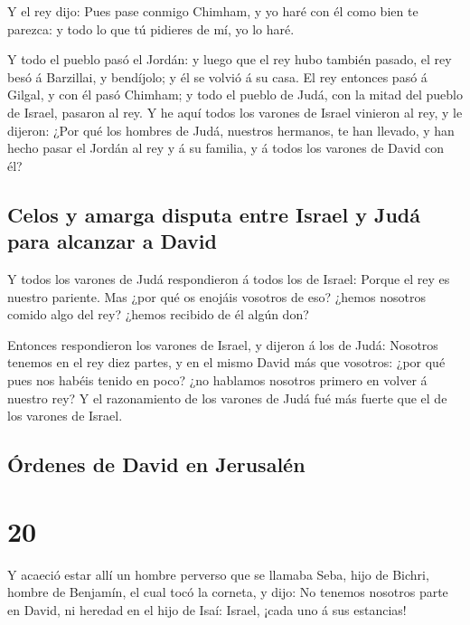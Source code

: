  Y el rey dijo: Pues pase conmigo Chimham, y yo haré con él
como bien te parezca: y todo lo que tú pidieres de mí, yo lo haré.

 Y todo el pueblo pasó el Jordán: y luego que el rey hubo
también pasado, el rey besó á Barzillai, y bendíjolo; y él se volvió á
su casa.  El rey entonces pasó á Gilgal, y con él pasó
Chimham; y todo el pueblo de Judá, con la mitad del pueblo de Israel,
pasaron al rey.  Y he aquí todos los varones de Israel
vinieron al rey, y le dijeron: ¿Por qué los hombres de Judá, nuestros
hermanos, te han llevado, y han hecho pasar el Jordán al rey y á su
familia, y á todos los varones de David con él?

\hypertarget{celos-y-amarga-disputa-entre-israel-y-juduxe1-para-alcanzar-a-david}{%
\subsection{Celos y amarga disputa entre Israel y Judá para alcanzar a
David}\label{celos-y-amarga-disputa-entre-israel-y-juduxe1-para-alcanzar-a-david}}

 Y todos los varones de Judá respondieron á todos los de
Israel: Porque el rey es nuestro pariente. Mas ¿por qué os enojáis
vosotros de eso? ¿hemos nosotros comido algo del rey? ¿hemos recibido de
él algún don?

 Entonces respondieron los varones de Israel, y dijeron á
los de Judá: Nosotros tenemos en el rey diez partes, y en el mismo David
más que vosotros: ¿por qué pues nos habéis tenido en poco? ¿no hablamos
nosotros primero en volver á nuestro rey? Y el razonamiento de los
varones de Judá fué más fuerte que el de los varones de Israel.

\hypertarget{uxf3rdenes-de-david-en-jerusaluxe9n}{%
\subsection{Órdenes de David en
Jerusalén}\label{uxf3rdenes-de-david-en-jerusaluxe9n}}

\hypertarget{section-19}{%
\section{20}\label{section-19}}

 Y acaeció estar allí un hombre perverso que se llamaba
Seba, hijo de Bichri, hombre de Benjamín, el cual tocó la corneta, y
dijo: No tenemos nosotros parte en David, ni heredad en el hijo de Isaí:
Israel, ¡cada uno á sus estancias!

